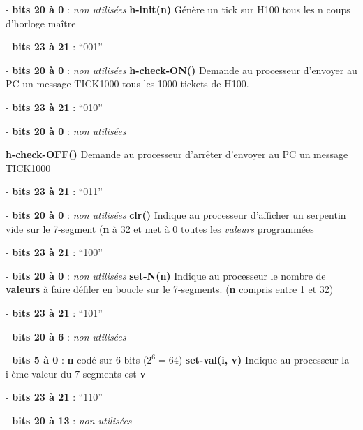 \documentclass[10pt]{article}
\begin{document}
        - \textbf{bits 20 à 0} : \textit{non utilisées}
        \newline
        \newline
        \textbf{h-init(n)} Génère un tick sur H100 tous les n coups d'horloge maître
        
        - \textbf{bits 23 à 21} : ``001''

        - \textbf{bits 20 à 0} : \textit{non utilisées}
        \newline
        \newline
        \textbf{h-check-ON()} Demande au processeur d'envoyer au PC un message TICK1000 tous les 1000 tickets de H100.
        
        - \textbf{bits 23 à 21} : ``010''

        - \textbf{bits 20 à 0} : \textit{non utilisées}

        \textbf{h-check-OFF()} Demande au processeur d'arrêter d'envoyer au PC un message TICK1000
        
        - \textbf{bits 23 à 21} : ``011''

        - \textbf{bits 20 à 0} : \textit{non utilisées}
        \newline
        \newline
        \textbf{clr()} Indique au processeur d'afficher un serpentin vide sur le 7-segment (\textbf{n} à 32 et met à 0 toutes les \textit{valeurs} programmées
        
        - \textbf{bits 23 à 21} : ``100''

        - \textbf{bits 20 à 0} : \textit{non utilisées}
        \newline
        \newline
        \textbf{set-N(n)} Indique au processeur le nombre de \textbf{valeurs} à faire défiler en boucle sur le 7-segments. (\textbf{n} compris entre 1 et 32)\label{N}
        
        - \textbf{bits 23 à 21} : ``101''

        - \textbf{bits 20 à 6} : \textit{non utilisées} 

        - \textbf{bits 5 à 0} : \textbf{n} codé sur 6 bits ($2^6 = 64$)
        \newline
        \newline
        \textbf{set-val(i, v)} Indique au processeur la i-ème valeur du 7-segments est \textbf{v}
        
        - \textbf{bits 23 à 21} : ``110''

        - \textbf{bits 20 à 13} : \textit{non utilisées} 
\end{document}
